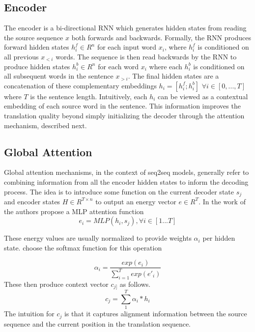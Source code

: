 \subsection{Encoder}
The encoder is a bi-directional \ac{RNN} which generates hidden states from reading the source sequence $x$ both forwards and backwards. Formally, the \ac{RNN} produces forward hidden states $h^{f}_{i} \in R^{n}$ for each input word $x_{i}$, where $h^{f}_{i}$ is conditioned on all previous $x_{<i}$ words. The sequence is then read backwards by the \ac{RNN} to produce hidden states $h^{b}_{i} \in R^{n}$ for each word $x_{i}$ where each $h^{b}_{i}$ is conditioned on all subsequent words in the sentence $x_{>i}$. The final hidden states are a concatenation of these complementary embeddings $h_{i}  = [h^{f}_{i} ; h^{b}_{i}]$ $ \forall i \in [0,...,T]$ where $T$ is the sentence length. Intuitively, each $h_{i}$ can be viewed as a contextual embedding of each source word in the sentence. This information improves the translation quality beyond simply initializing the decoder through the attention mechanism, described next. 

\subsection{Global Attention}

Global attention mechanisms, in the context of \ac{seq2seq} models, generally refer to combining information from all the encoder hidden states to inform the decoding process. The idea is to introduce some function on the current decoder state $s_{j}$ and encoder states $H \in R^{T \times n}$ to output an energy vector $e \in R^{T}$. In the work of \citet{bahdanau2014NMTBYJoint} the authors propose a \ac{MLP} attention function
\begin{equation}
e_{i} = MLP(h_{i}, s_{j}), \forall i \in [1...T]
\end{equation}


These energy values are usually normalized to provide weights $\alpha_{i}$ per hidden state. \citet{bahdanau2014NMTBYJoint} choose the softmax function for this operation 

\begin{equation}
	\alpha_{i} = \frac{exp(e_{i})}{\sum_{i=1}^{T} exp(e'_{i})}
\end{equation}
These then produce context vector $c_{j]}$ as follows. 
\begin{equation}
c_{j} = \sum_{1}^{T} \alpha_{i} * h_{i}
\end{equation}
The intuition for $c_{j}$ is that it captures alignment information between the source sequence and the current position in the translation sequence. %

